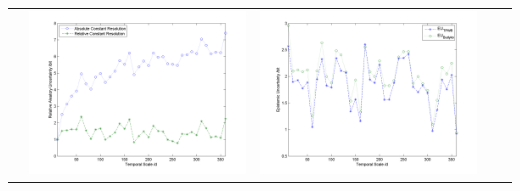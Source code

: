 \documentclass[11pt]{article}
\begin{document}
\begin{table}[H]
{\begin{tabular}{c  c   c   c  c }
&\begin{minipage}{.4\textwidth}\includegraphics[width=\linewidth]{resultgraph/06914000AU.png}\end{minipage}
&\begin{minipage}{.4\textwidth}\includegraphics[width=\linewidth]{resultgraph/06914000EU.png}\end{minipage}
\\

\end{tabular}}
\end{table}
\end{document}
